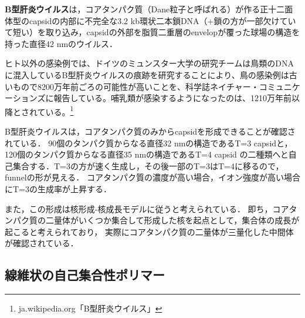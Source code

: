 \documentclass[uplatex, dvipdfmx]{jsreport}
\begin{document}
\begin{definition}
    \textbf{B型肝炎ウイルス}は，コアタンパク質（Dane粒子と呼ばれる）が作る正十二面体型のcapsidの内部に不完全な3.2 kb環状二本鎖DNA（+鎖の方が一部欠けていて短い）を取り込み，capsidの外部を脂質二重層のenvelopが覆った球場の構造を持った直径42 nmのウイルス．
\end{definition}
\begin{remark}
    ヒト以外の感染例では、ドイツのミュンスター大学の研究チームは鳥類のDNAに混入しているB型肝炎ウイルスの痕跡を研究することにより、鳥の感染例は古いもので8200万年前ごろの可能性が高いことを、科学誌ネイチャー・コミュニケーションズに報告している。哺乳類が感染するようになったのは、1210万年前以降とされている。\footnote{ja.wikipedia.org「B型肝炎ウイルス」}
\end{remark}
\begin{example}
    B型肝炎ウイルスは，コアタンパク質のみからcapsidを形成できることが確認されている．
    90個のタンパク質からなる直径32 nmの構造であるT=3 capsidと，
    120個のタンパク質からなる直径35 nmの構造であるT=4 capsid
    の二種類へと自己集合する．T=3の方が速く生成し，その後一部のT=3はT=4に移るので，funnelの形が見える．
    コアタンパク質の濃度が高い場合，イオン強度が高い場合にT=3の生成率が上昇する．

    また，この形成は核形成-核成長モデルに従うと考えられている．
    即ち，コアタンパク質の二量体がいくつか集合して形成した核を起点として，集合体の成長が起こると考えられており，
    実際にコアタンパク質の二量体が三量化した中間体が確認されている．
\end{example}

\subsection{線維状の自己集合性ポリマー}
\end{document}

